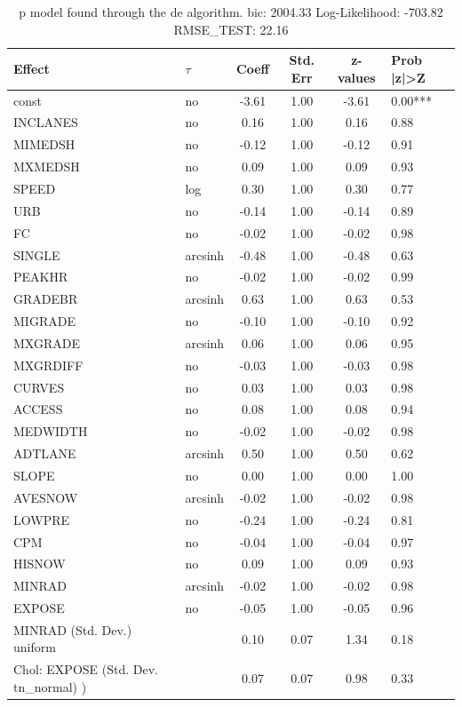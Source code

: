 \begin{table}
	\caption{p model found through the de algorithm. bic: 2004.33 Log-Likelihood: -703.82 RMSE_TEST: 22.16}
	\begin{center}
		\begin{tabular}{|l|l|c|c|c|l|}
			\hline
			Effect & $\tau$ & Coeff & Std. Err & z-values & Prob |z|>Z \\
			\hline
			const & no & -3.61 & 1.00 & -3.61 & 0.00*** \\
			\hline
			INCLANES & no & 0.16 & 1.00 & 0.16 & 0.88 \\
			\hline
			MIMEDSH & no & -0.12 & 1.00 & -0.12 & 0.91 \\
			\hline
			MXMEDSH & no & 0.09 & 1.00 & 0.09 & 0.93 \\
			\hline
			SPEED & log & 0.30 & 1.00 & 0.30 & 0.77 \\
			\hline
			URB & no & -0.14 & 1.00 & -0.14 & 0.89 \\
			\hline
			FC & no & -0.02 & 1.00 & -0.02 & 0.98 \\
			\hline
			SINGLE & arcsinh & -0.48 & 1.00 & -0.48 & 0.63 \\
			\hline
			PEAKHR & no & -0.02 & 1.00 & -0.02 & 0.99 \\
			\hline
			GRADEBR & arcsinh & 0.63 & 1.00 & 0.63 & 0.53 \\
			\hline
			MIGRADE & no & -0.10 & 1.00 & -0.10 & 0.92 \\
			\hline
			MXGRADE & arcsinh & 0.06 & 1.00 & 0.06 & 0.95 \\
			\hline
			MXGRDIFF & no & -0.03 & 1.00 & -0.03 & 0.98 \\
			\hline
			CURVES & no & 0.03 & 1.00 & 0.03 & 0.98 \\
			\hline
			ACCESS & no & 0.08 & 1.00 & 0.08 & 0.94 \\
			\hline
			MEDWIDTH & no & -0.02 & 1.00 & -0.02 & 0.98 \\
			\hline
			ADTLANE & arcsinh & 0.50 & 1.00 & 0.50 & 0.62 \\
			\hline
			SLOPE & no & 0.00 & 1.00 & 0.00 & 1.00 \\
			\hline
			AVESNOW & arcsinh & -0.02 & 1.00 & -0.02 & 0.98 \\
			\hline
			LOWPRE & no & -0.24 & 1.00 & -0.24 & 0.81 \\
			\hline
			CPM & no & -0.04 & 1.00 & -0.04 & 0.97 \\
			\hline
			HISNOW & no & 0.09 & 1.00 & 0.09 & 0.93 \\
			\hline
			MINRAD & arcsinh & -0.02 & 1.00 & -0.02 & 0.98 \\
			\hline
			EXPOSE & no & -0.05 & 1.00 & -0.05 & 0.96 \\
			\hline
			MINRAD (Std. Dev.) uniform &  & 0.10 & 0.07 & 1.34 & 0.18 \\
			\hline
			 Chol: EXPOSE (Std. Dev. tn_normal) ) &  & 0.07 & 0.07 & 0.98 & 0.33 \\
			\hline
		\end{tabular}
	\end{center}
\end{table}